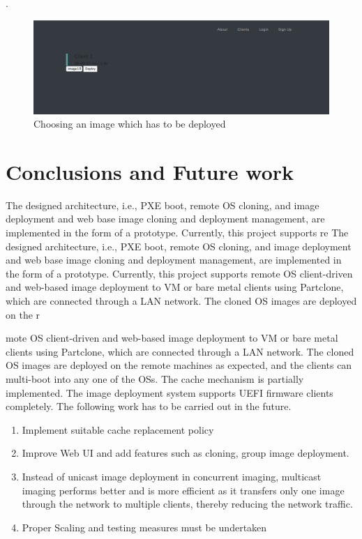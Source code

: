 \documentclass[a4paper,12pt]{article}
\begin{document}
.
\newpage
\begin{figure}[H]
    \centering
    \includegraphics[width=0.9\linewidth]{webapp3.png}
    \caption{Choosing an image which has to be deployed}
    \label{task_image_deploy}
\end{figure}

\newpage
\section{\fontsize{16pt}{1em} Conclusions and Future work}
 The designed architecture, i.e., PXE boot, remote OS cloning, and image deployment and web base image cloning and deployment management, are implemented in the form of a prototype. Currently, this project supports re The designed architecture, i.e., PXE boot, remote OS cloning, and image deployment and web base image cloning and deployment management, are implemented in the form of a prototype. Currently, this project supports remote OS client-driven and web-based image deployment to VM or bare metal clients using Partclone, which are connected through a LAN network. The cloned OS images are deployed on the r

mote OS client-driven and web-based image deployment to VM or bare metal clients using Partclone, which are connected through a LAN network. The cloned OS images are deployed on the remote machines as expected, and the clients can multi-boot into any one of the OSs. The cache mechanism is partially implemented. The image deployment system supports UEFI firmware clients completely. The following work has to be carried out in the future.
\begin{enumerate}
    \item Implement suitable cache replacement policy  
    \item Improve Web UI and add features such as cloning, group image deployment.
    \item Instead of unicast image deployment in concurrent imaging, multicast imaging performs better and is more efficient as it transfers only one image through the network to multiple clients, thereby reducing the network traffic.
    \item Proper Scaling and testing measures must be undertaken
\end{enumerate}
\end{document}
